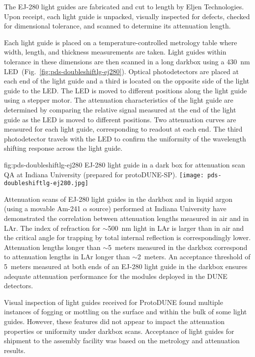 The EJ-280 light guides are fabricated and cut to length by Eljen Technologies. Upon receipt, each light guide is unpacked, visually inspected for defects, checked for dimensional tolerance, and scanned to determine its attenuation length.

Each light guide is placed on a temperature-controlled metrology table where width, length, and thickness measurements are taken. Light guides within tolerance in these dimensions are then scanned in a long darkbox using a 430~nm LED~(Fig.~\ref{fig:pds-doubleshiftlg-ej280}). Optical photodetectors are placed at each end of the light guide and a third is located on the opposite side of the light guide to the LED. The LED is moved to different positions along the light guide using a stepper motor. The attenuation characteristics of the light guide are determined by comparing the relative signal measured at the end of the light guide as the LED is moved to different positions. Two attenuation curves are measured for each light guide, corresponding to readout at each end. The third photodetector travels with the LED to confirm the uniformity of the wavelength shifting response across the light guide.

\begin{dunefigure}{fig:pds-doubleshiftlg-ej280}
{EJ-280 light guide in a dark box for attenuation scan QA at Indiana University (prepared for protoDUNE-SP).}
  \texttt{[image: pds-doubleshiftlg-ej280.jpg]}
\end{dunefigure}

Attenuation scans of EJ-280 light guides in the darkbox and in liquid argon (using a movable Am-241 $\alpha$ source) performed at Indiana University have demonstrated the correlation between attenuation lengths measured in air and in LAr. The index of refraction for $\sim$500~nm light in LAr is larger than in air and the critical angle for trapping by total internal reflection is correspondingly lower. Attenuation lengths longer than $\sim$5~meters measured in the darkbox correspond to attenuation lengths in LAr longer than $\sim$2~meters. An acceptance threshold of 5~meters measured at both ends of an EJ-280 light guide in the darkbox ensures adequate attenuation performance for the modules deployed in the DUNE detectors.

Visual inspection of light guides received for ProtoDUNE found multiple instances of fogging or mottling on the surface and within the bulk of some light guides. However, these features did not appear to impact the attenuation properties or uniformity under darkbox scans. Acceptance of light guides for shipment to the assembly facility was based on the metrology and attenuation results.

